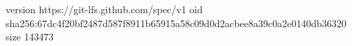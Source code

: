 version https://git-lfs.github.com/spec/v1
oid sha256:67dc4f20bf2487d587f8911b65915a58c09d0d2acbee8a39c0a2e0140db36320
size 143473
